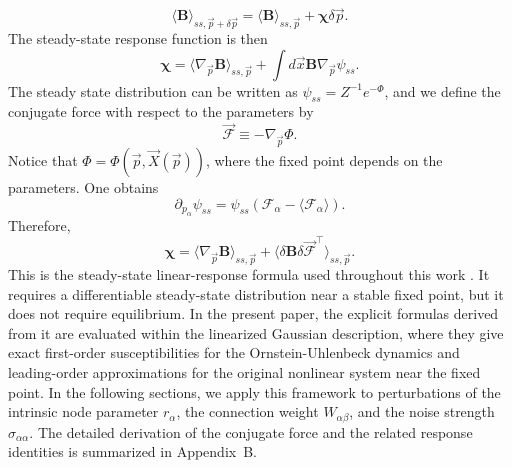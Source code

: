 \begin{equation}
    \langle \mathbf{B} \rangle_{ss, \vec{p}+\delta \vec{p}} = \langle \mathbf{B} \rangle_{ss, \vec{p}} + \boldsymbol{\chi} \delta \vec{p}.
    \label{response}
\end{equation}
The steady-state response function is then
\begin{equation}
    \boldsymbol{\chi} = \langle \nabla_{\vec{p}} \mathbf{B} \rangle_{ss, \vec{p}} + \int d\vec{x} \mathbf{B} \nabla_{\vec{p}} \psi_{ss}.
    \label{response_function}
\end{equation}
The steady state distribution can be written as $\psi_{ss}=Z^{-1}e^{-\Phi}$, and we define the conjugate force with respect to the parameters by
\begin{equation}
    \vec{\mathscr{F}} \equiv -\nabla_{\vec{p}} \Phi.
    \label{conjugate_force}
\end{equation} 
Notice that $\Phi=\Phi(\vec{p}, \vec{X}(\vec{p}))$, where the fixed point depends on the parameters. One obtains
\begin{equation}
    \partial_{p_\alpha} \psi_{ss} = \psi_{ss}(\mathscr{F}_\alpha-\langle \mathscr{F}_\alpha \rangle).
\end{equation}
Therefore,
\begin{equation}
    \boldsymbol{\chi} = \langle \nabla_{\vec{p}} \mathbf{B} \rangle_{ss, \vec{p}} + \langle \delta \mathbf{B} \delta \vec{\mathscr{F}}^\intercal \rangle_{ss, \vec{p}}.
    \label{response_function2}
\end{equation}
This is the steady-state linear-response formula used throughout this work \cite{softmatter}. It requires a differentiable steady-state distribution near a stable fixed point, but it does not require equilibrium. In the present paper, the explicit formulas derived from it are evaluated within the linearized Gaussian description, where they give exact first-order susceptibilities for the Ornstein-Uhlenbeck dynamics and leading-order approximations for the original nonlinear system near the fixed point. In the following sections, we apply this framework to perturbations of the intrinsic node parameter $r_\alpha$, the connection weight $W_{\alpha\beta}$, and the noise strength $\sigma_{\alpha\alpha}$. The detailed derivation of the conjugate force and the related response identities is summarized in Appendix~B.
